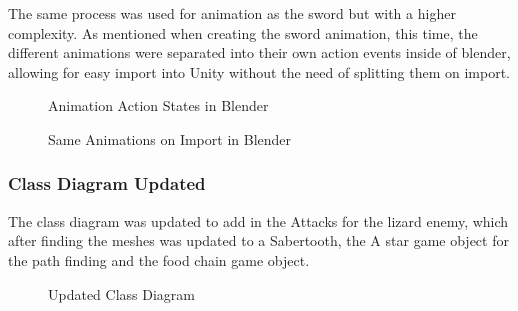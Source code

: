 \documentclass[11pt]{report}
\begin{document}
The same process was used for animation as the sword but with a higher complexity. As mentioned when creating the sword animation, this time, the different animations were separated into their own action events inside of blender, allowing for easy import into Unity without the need of splitting them on import.
\begin{figure}[H]
    \begin{minipage}{.5\textwidth}
        \centering
        \caption{Animation Action States in Blender}
    \end{minipage}
    \begin{minipage}{.5\textwidth}
        \centering
        \caption{Same Animations on Import in Blender}
    \end{minipage}
\end{figure}


\subsubsection{Class Diagram Updated}

The class diagram was updated to add in the Attacks for the lizard enemy, which after finding the meshes was updated to a Sabertooth, the A star game object for the path finding and the food chain game object.

\begin{figure}[H]
    \centering
    \caption{Updated Class Diagram}
\end{figure}
\end{document}
